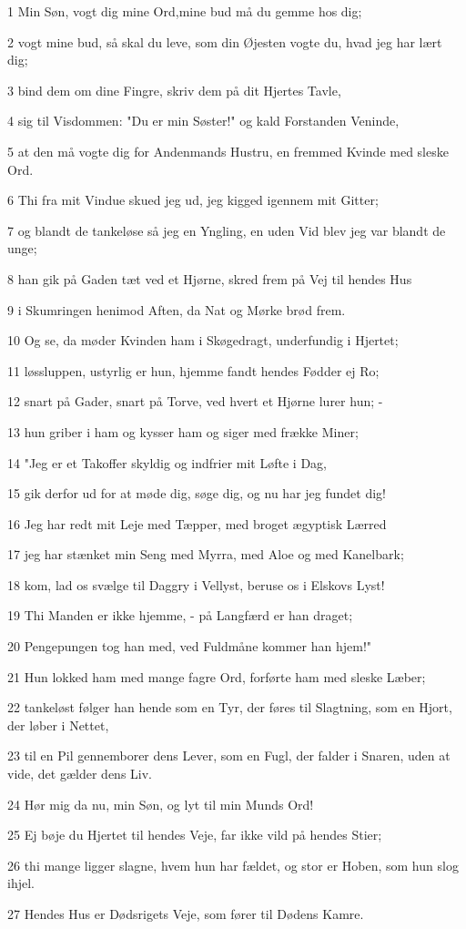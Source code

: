 \par 1 Min Søn, vogt dig mine Ord,mine bud må du gemme hos dig;
\par 2 vogt mine bud, så skal du leve, som din Øjesten vogte du, hvad jeg har lært dig;
\par 3 bind dem om dine Fingre, skriv dem på dit Hjertes Tavle,
\par 4 sig til Visdommen: "Du er min Søster!" og kald Forstanden Veninde,
\par 5 at den må vogte dig for Andenmands Hustru, en fremmed Kvinde med sleske Ord.
\par 6 Thi fra mit Vindue skued jeg ud, jeg kigged igennem mit Gitter;
\par 7 og blandt de tankeløse så jeg en Yngling, en uden Vid blev jeg var blandt de unge;
\par 8 han gik på Gaden tæt ved et Hjørne, skred frem på Vej til hendes Hus
\par 9 i Skumringen henimod Aften, da Nat og Mørke brød frem.
\par 10 Og se, da møder Kvinden ham i Skøgedragt, underfundig i Hjertet;
\par 11 løssluppen, ustyrlig er hun, hjemme fandt hendes Fødder ej Ro;
\par 12 snart på Gader, snart på Torve, ved hvert et Hjørne lurer hun; -
\par 13 hun griber i ham og kysser ham og siger med frække Miner;
\par 14 "Jeg er et Takoffer skyldig og indfrier mit Løfte i Dag,
\par 15 gik derfor ud for at møde dig, søge dig, og nu har jeg fundet dig!
\par 16 Jeg har redt mit Leje med Tæpper, med broget ægyptisk Lærred
\par 17 jeg har stænket min Seng med Myrra, med Aloe og med Kanelbark;
\par 18 kom, lad os svælge til Daggry i Vellyst, beruse os i Elskovs Lyst!
\par 19 Thi Manden er ikke hjemme, - på Langfærd er han draget;
\par 20 Pengepungen tog han med, ved Fuldmåne kommer han hjem!"
\par 21 Hun lokked ham med mange fagre Ord, forførte ham med sleske Læber;
\par 22 tankeløst følger han hende som en Tyr, der føres til Slagtning, som en Hjort, der løber i Nettet,
\par 23 til en Pil gennemborer dens Lever, som en Fugl, der falder i Snaren, uden at vide, det gælder dens Liv.
\par 24 Hør mig da nu, min Søn, og lyt til min Munds Ord!
\par 25 Ej bøje du Hjertet til hendes Veje, far ikke vild på hendes Stier;
\par 26 thi mange ligger slagne, hvem hun har fældet, og stor er Hoben, som hun slog ihjel.
\par 27 Hendes Hus er Dødsrigets Veje, som fører til Dødens Kamre.

